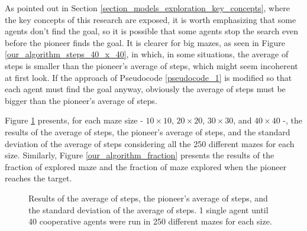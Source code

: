 As pointed out in Section \ref{section_models_exploration_key_concepts}, where the key concepts of this research are exposed, it is worth emphasizing that some agents don't find the goal, so it is possible that some agents stop the search even before the pioneer finds the goal. It is clearer for big mazes, as seen in Figure \ref{our_algorithm_steps_40_x_40}, in which, in some situations, the average of steps is smaller than the pioneer's average of steps, which might seem incoherent at first look. If the approach of Pseudocode \ref{pseudocode_1} is modified so that each agent must find the goal anyway, obviously the average of steps must be bigger than the pioneer's average of steps.

Figure \ref{our_algorithm_steps} presents, for each maze size - $10 \times 10$, $20 \times 20$, $30 \times 30$, and $40 \times 40$ -, the results of the average of steps, the pioneer's average of steps, and the standard deviation of the average of steps considering all the 250 different mazes for each size. Similarly, Figure \ref{our_algorithm_fraction} presents the results of the fraction of explored maze and the fraction of maze explored when the pioneer reaches the target.

\begin{figure}
    \centering
    \qquad
    \qquad
    \newline
    \qquad
    \caption{Results of the average of steps, the pioneer's average of steps, and the standard deviation of the average of steps. 1 single agent until 40 cooperative agents were run in 250 different mazes for each size.}
    \label{our_algorithm_steps}
\end{figure}

